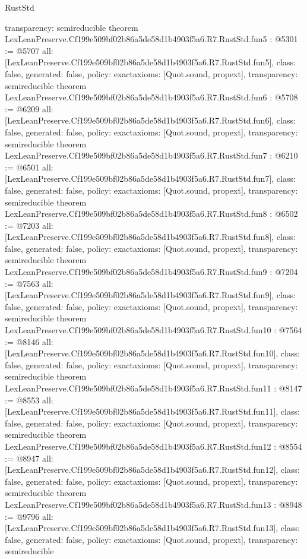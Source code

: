 \begin{lexlean}{RustStd}
\begin{coremodule}
{  transparency: semireducible
}
theorem LexLeanPreserve.Cf199e509bf02b86a5de58d1b4903f5a6.R7.RustStd.fun5 : @5301 := @5707 {
  all: [LexLeanPreserve.Cf199e509bf02b86a5de58d1b4903f5a6.R7.RustStd.fun5],
  class: false,
  generated: false,
  policy: exact{axioms: [Quot.sound, propext]},
  transparency: semireducible
}
theorem LexLeanPreserve.Cf199e509bf02b86a5de58d1b4903f5a6.R7.RustStd.fun6 : @5708 := @6209 {
  all: [LexLeanPreserve.Cf199e509bf02b86a5de58d1b4903f5a6.R7.RustStd.fun6],
  class: false,
  generated: false,
  policy: exact{axioms: [Quot.sound, propext]},
  transparency: semireducible
}
theorem LexLeanPreserve.Cf199e509bf02b86a5de58d1b4903f5a6.R7.RustStd.fun7 : @6210 := @6501 {
  all: [LexLeanPreserve.Cf199e509bf02b86a5de58d1b4903f5a6.R7.RustStd.fun7],
  class: false,
  generated: false,
  policy: exact{axioms: [Quot.sound, propext]},
  transparency: semireducible
}
theorem LexLeanPreserve.Cf199e509bf02b86a5de58d1b4903f5a6.R7.RustStd.fun8 : @6502 := @7203 {
  all: [LexLeanPreserve.Cf199e509bf02b86a5de58d1b4903f5a6.R7.RustStd.fun8],
  class: false,
  generated: false,
  policy: exact{axioms: [Quot.sound, propext]},
  transparency: semireducible
}
theorem LexLeanPreserve.Cf199e509bf02b86a5de58d1b4903f5a6.R7.RustStd.fun9 : @7204 := @7563 {
  all: [LexLeanPreserve.Cf199e509bf02b86a5de58d1b4903f5a6.R7.RustStd.fun9],
  class: false,
  generated: false,
  policy: exact{axioms: [Quot.sound, propext]},
  transparency: semireducible
}
theorem LexLeanPreserve.Cf199e509bf02b86a5de58d1b4903f5a6.R7.RustStd.fun10 : @7564 := @8146 {
  all: [LexLeanPreserve.Cf199e509bf02b86a5de58d1b4903f5a6.R7.RustStd.fun10],
  class: false,
  generated: false,
  policy: exact{axioms: [Quot.sound, propext]},
  transparency: semireducible
}
theorem LexLeanPreserve.Cf199e509bf02b86a5de58d1b4903f5a6.R7.RustStd.fun11 : @8147 := @8553 {
  all: [LexLeanPreserve.Cf199e509bf02b86a5de58d1b4903f5a6.R7.RustStd.fun11],
  class: false,
  generated: false,
  policy: exact{axioms: [Quot.sound, propext]},
  transparency: semireducible
}
theorem LexLeanPreserve.Cf199e509bf02b86a5de58d1b4903f5a6.R7.RustStd.fun12 : @8554 := @8947 {
  all: [LexLeanPreserve.Cf199e509bf02b86a5de58d1b4903f5a6.R7.RustStd.fun12],
  class: false,
  generated: false,
  policy: exact{axioms: [Quot.sound, propext]},
  transparency: semireducible
}
theorem LexLeanPreserve.Cf199e509bf02b86a5de58d1b4903f5a6.R7.RustStd.fun13 : @8948 := @9796 {
  all: [LexLeanPreserve.Cf199e509bf02b86a5de58d1b4903f5a6.R7.RustStd.fun13],
  class: false,
  generated: false,
  policy: exact{axioms: [Quot.sound, propext]},
  transparency: semireducible
}
\end{coremodule}
\end{lexlean}
